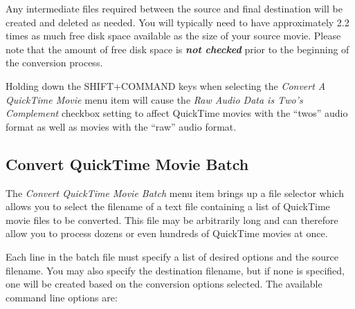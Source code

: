 \documentclass[12pt,letterpaper,twoside]{article}
\begin{document}
Any intermediate files required between the source and final destination will be created and deleted as
needed. You will typically need to have approximately 2.2 times as much free disk space available as
the size of your source movie. Please note that the amount of free disk space is \textbf{\textit{not checked}} prior to
the beginning of the conversion process.

Holding down the SHIFT+COMMAND keys when selecting the \textit{Convert A QuickTime Movie} menu item
will cause the \textit{Raw Audio Data is Two's Complement} checkbox setting to affect QuickTime movies
with the ``twos'' audio format as well as movies with the ``raw'' audio format.

\subsection{Convert QuickTime Movie Batch}

The \textit{Convert QuickTime Movie Batch} menu item brings up a file selector which allows you to select the
filename of a text file containing a list of QuickTime movie files to be converted. This file may be
arbitrarily long and can therefore allow you to process dozens or even hundreds of QuickTime movies
at once.

Each line in the batch file must specify a list of desired options and the source filename. You may also
specify the destination filename, but if none is specified, one will be created based on the conversion
options selected. The available command line options are:
\end{document}
